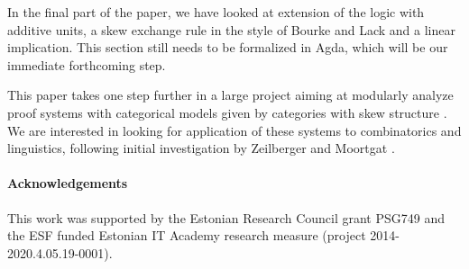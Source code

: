 \documentclass[submission,copyright,creativecommons]{eptcs}
\theoremstyle{definition}
\begin{document}
In the final part of the paper, we have looked at extension of the logic with additive units, a skew exchange rule in the style of Bourke and Lack \cite{bourke:lack:braided:2020} and a linear implication. This section still needs to be formalized in Agda, which will be our immediate forthcoming step.

This paper takes one step further in a large project aiming at modularly analyze proof systems with categorical models given by categories with skew structure \cite{zeilberger:semiassociative:19, uustalu:sequent:2021,uustalu:proof:nodate,uustalu:deductive:nodate,veltri:coherence:2021,UVW:protsn}. We are interested in looking for application of these systems to combinatorics and linguistics, following initial investigation by Zeilberger \cite{zeilberger:semiassociative:19} and Moortgat \cite{moortgat:tamari:20}.


\paragraph{Acknowledgements}
This work was supported by the Estonian Research Council grant PSG749 and the ESF funded Estonian IT Academy research measure (project 2014-2020.4.05.19-0001). 

  
  
\end{document}
